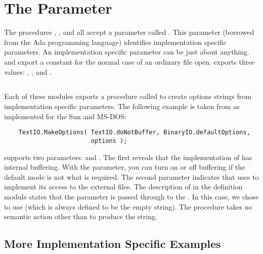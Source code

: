 \section{The  Parameter}
\label{IOOptions}

The procedures , , and
 all accept a parameter called
.  This parameter (borrowed from the Ada programming
language) identifies
implementation specific parameters.  An implementation specific
parameter can be just about anything.   and
 export a constant 
for the normal case of an ordinary file open.  
exports three values: , 
, and .

\subsection{}

Each of these modules exports a procedure called 
to create options strings from implementation specific parameters.
The following example is taken from  as implemented
for the Sun and MS-DOS:
\begin{verbatim}
    TextIO.MakeOptions( TextIO.doNotBuffer, BinaryIO.defaultOptions,
                        options );
\end{verbatim}
 supports two parameters:
 and .
The first reveals that the implementation of   
has internal buffering.  With the parameter, you can turn on or
off buffering if the default mode is not what is required.  The
second parameter indicates that  uses 
to implement its access to the external files.
The description of  in the definition
module states that the  parameter is passed
through to the .  In this case, we chose
to use  (which is always defined
to be the empty string).
The procedure  takes no semantic action other
than to produce the  string.

\subsection{More Implementation Specific Examples}

